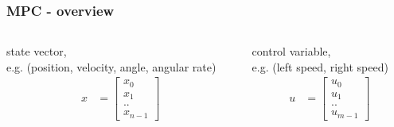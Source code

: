 \documentclass{beamer}
\begin{document}
\begin{frame}
  
  \frametitle{\textbf { MPC - overview }}
  
 
  \begin{columns}

    \begin{column}{0.5\textwidth}
      state vector, \\ e.g. (position, velocity, angle, angular rate)
      \begin{align*}
        x &=
        \begin{bmatrix}
          x_0 \\
          x_1 \\
          ..  \\
          x_{n-1}  
        \end{bmatrix}
      \end{align*}
    \end{column}

    \begin{column}{0.5\textwidth}
      control variable, \\ e.g. (left speed, right speed)
      \begin{align*}
        u &=
        \begin{bmatrix}
          u_0 \\
          u_1 \\
          ..  \\
          u_{m-1}  
        \end{bmatrix}
      \end{align*}
    \end{column}

  \end{columns}

\end{frame}
\end{document}

